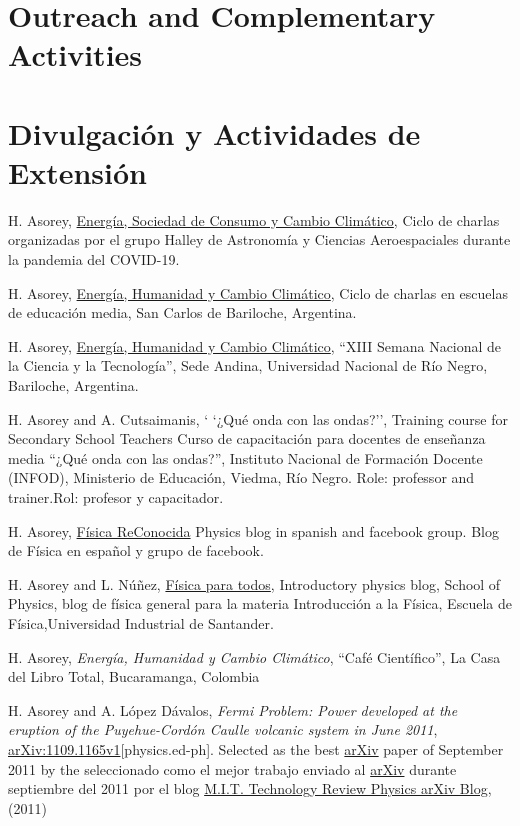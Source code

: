 \ifeng
\section*{Outreach and Complementary Activities}
\else
\section*{Divulgación y Actividades de Extensión}
\fi
\noindent

H. Asorey, \href{https://www.youtube.com/watch?v=i4sUhccG6ZI}{Energía, Sociedad de Consumo y Cambio Climático}, Ciclo de charlas organizadas por el grupo Halley de Astronomía y Ciencias Aeroespaciales durante la pandemia del COVID-19.

H. Asorey, \href{}{Energía, Humanidad y Cambio Climático}, Ciclo de charlas en escuelas de educación media, San Carlos de Bariloche, Argentina.

H. Asorey, \href{http://www.semanadelaciencia.mincyt.gob.ar/}{Energía, Humanidad y Cambio Climático}, ``XIII Semana Nacional de la Ciencia y la Tecnología'', Sede Andina, Universidad Nacional de Río Negro, Bariloche, Argentina.

H. Asorey and A. Cutsaimanis, \ifeng ` `¿Qué onda con las ondas?'', Training course for Secondary School Teachers \else Curso de capacitación para docentes de enseñanza media ``¿Qué onda con las ondas?'', \fi Instituto Nacional de Formación Docente (INFOD), Ministerio de Educación, Viedma, Río Negro. \ifeng Role: professor and trainer.\else Rol: profesor y capacitador.\fi

H. Asorey, \href{http://fisicareconocida.blogspot.com}{Física ReConocida} \ifeng Physics blog in spanish and facebook group. \else Blog de Física en español y grupo de facebook.\fi 

 H. Asorey and L. Núñez, \href{http://halley.uis.edu.co/fisica_para_todos}{Física para todos}, \ifeng Introductory physics blog, School of Physics, \else blog de física general para la materia Introducción a la Física, Escuela de Física,\fi Universidad Industrial de Santander.

H. Asorey, {\textit{Energía, Humanidad y Cambio Climático}}, ``Café Científico'', La Casa del Libro Total, Bucaramanga, Colombia

H. Asorey and A. López Dávalos, {\emph{Fermi Problem: Power
developed at the eruption of the Puyehue-Cordón Caulle volcanic system in June
2011}}, \href{http://arxiv.org/abs/1109.1165}{arXiv:1109.1165v1}[physics.ed-ph]. \ifeng
Selected as the best \href{http://arxiv.org}{arXiv} paper of September 2011 by the
\else
seleccionado como el mejor trabajo enviado al \href{http://arxiv.org}{arXiv} durante septiembre del 2011 por el blog
\fi
\href{http://www.technologyreview.com/blog/arxiv/27140/}{M.I.T. Technology
Review Physics arXiv Blog}, (2011)

